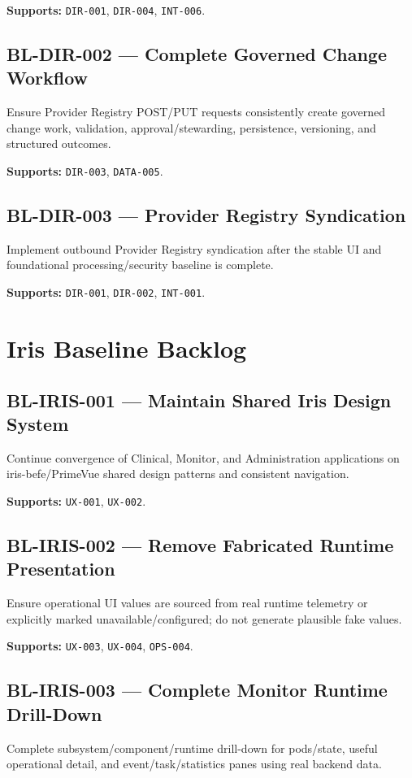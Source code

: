 \textbf{Supports:} \texttt{DIR-001}, \texttt{DIR-004}, \texttt{INT-006}.

\subsection{BL-DIR-002 --- Complete Governed Change Workflow}
Ensure Provider Registry POST/PUT requests consistently create governed change work, validation, approval/stewarding, persistence, versioning, and structured outcomes.

\textbf{Supports:} \texttt{DIR-003}, \texttt{DATA-005}.

\subsection{BL-DIR-003 --- Provider Registry Syndication}
Implement outbound Provider Registry syndication after the stable UI and foundational processing/security baseline is complete.

\textbf{Supports:} \texttt{DIR-001}, \texttt{DIR-002}, \texttt{INT-001}.

\section{Iris Baseline Backlog}

\subsection{BL-IRIS-001 --- Maintain Shared Iris Design System}
Continue convergence of Clinical, Monitor, and Administration applications on iris-befe/PrimeVue shared design patterns and consistent navigation.

\textbf{Supports:} \texttt{UX-001}, \texttt{UX-002}.

\subsection{BL-IRIS-002 --- Remove Fabricated Runtime Presentation}
Ensure operational UI values are sourced from real runtime telemetry or explicitly marked unavailable/configured; do not generate plausible fake values.

\textbf{Supports:} \texttt{UX-003}, \texttt{UX-004}, \texttt{OPS-004}.

\subsection{BL-IRIS-003 --- Complete Monitor Runtime Drill-Down}
Complete subsystem/component/runtime drill-down for pods/state, useful operational detail, and event/task/statistics panes using real backend data.

